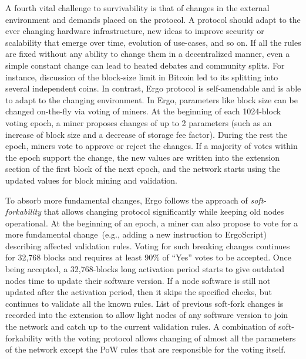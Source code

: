 A fourth vital challenge to survivability is that of changes in the external environment and demands placed on the protocol.
A protocol should  adapt to the ever changing hardware infrastructure, new ideas to improve security or
scalability that emerge over time, evolution of use-cases, and so on.
If all the rules are fixed without any ability to change them in a decentralized manner, even
a simple constant change can lead to heated debates and community splits. For instance,  discussion of the block-size limit in Bitcoin led to its splitting into several independent coins.
In contrast, Ergo protocol is self-amendable and is able to adapt to the changing environment.
In Ergo, parameters like block size can be changed on-the-fly via voting of miners.
At the beginning of each 1024-block voting epoch, a miner proposes changes of up to 2 parameters (such as an increase of block size and a decrease of storage fee factor). During the rest the epoch, miners vote to approve or reject the changes.
If a majority of votes within the epoch support the change, the new values are written into the extension section of the first block of the next epoch, and
the network starts using the updated values for block mining and validation.

To absorb more fundamental changes, Ergo follows the approach of {\em soft-forkability} that
allows changing protocol significantly while keeping old nodes operational.
At the beginning of an epoch, a miner can also propose to vote for a more fundamental change~(e.g., adding a new instruction to ErgoScript) describing affected validation rules.
Voting for such breaking changes continues for 32,768 blocks and requires at least $90\%$ of
``Yes'' votes to be accepted. Once being accepted, a 32,768-blocks long activation period starts to give outdated nodes time to update their software version.
If a node software is still not updated after the activation period, then it skips the specified checks, but continues to validate all the known rules.
List of previous soft-fork changes is recorded into the extension to allow light nodes of
any software version to join the network and catch up to the current validation rules.
A combination of soft-forkability with the voting protocol allows changing of almost all the parameters of the network except the PoW rules that are responsible for the voting itself.
